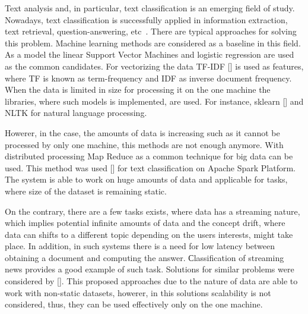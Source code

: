 \label {fs-short-intro}



Text analysis and, in particular, text classification is an emerging field of study. Nowadays, text classification is successfully applied in information extraction, text retrieval, question-answering, etc~\cite{tampakas2005}.
There are typical approaches for solving this problem. Machine learning methods are considered as a baseline in this field. As a model the linear Support Vector Machines and logistic regression are used as the common candidates. For vectorizing the data TF-IDF [] is used as features, where TF is known as term-frequency and IDF as inverse document frequency. When the data is limited in size for processing it on the one machine the libraries, where such models is implemented, are used. For instance, sklearn [] and NLTK for natural language processing.

Howerer, in the case, the amounts of data is increasing such as it cannot be processed by only one machine, this methods are not enough anymore. With distributed processing Map Reduce as a common technique for big data can be used. This method was used [] for text classification on Apache Spark Platform. The system is able to work on huge amounts of data and applicable for tasks, where size of the dataset is remaining static.

On the contrary, there are a few tasks exists, where data has a streaming nature, which implies potential infinite amounts of data and the concept drift, where data can shifts to a different topic depending on the users interests, might take place. In addition, in such systems there is a need for low latency between obtaining a document and computing the answer. Сlassification of streaming news provides a good example of such task. Solutions for similar problems were considered by []. This proposed approaches due to the nature of data are able to work with non-static datasets, howerer, in this solutions scalability is not considered, thus, they can be used effectively only on the one machine.


